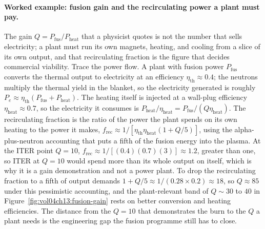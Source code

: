 \paragraph{Worked example: fusion gain and the recirculating power a plant must pay.}
The gain $Q = P_{\mathrm{fus}}/P_{\mathrm{heat}}$ that a physicist quotes is not
the number that sells electricity; a plant must run its own magnets, heating,
and cooling from a slice of its own output, and that recirculating fraction is
the figure that decides commercial viability. Trace the power flow. A plant with
fusion power $P_{\mathrm{fus}}$ converts the thermal output to electricity at an
efficiency $\eta_{\mathrm{th}} \approx 0.4$; the neutrons multiply the thermal
yield in the blanket, so the electricity generated is roughly $P_e \approx
\eta_{\mathrm{th}}(P_{\mathrm{fus}} + P_{\mathrm{heat}})$. The heating itself is
injected at a wall-plug efficiency $\eta_{\mathrm{heat}} \approx 0.7$, so the
electricity it consumes is $P_{\mathrm{heat}}/\eta_{\mathrm{heat}} =
P_{\mathrm{fus}}/(Q\eta_{\mathrm{heat}})$. The recirculating fraction is the
ratio of the power the plant spends on its own heating to the power it makes,
$f_{\mathrm{rec}} \approx 1/[\eta_{\mathrm{th}}\eta_{\mathrm{heat}}(1 + Q/5)]$,
using the alpha-plus-neutron accounting that puts a fifth of the fusion energy
into the plasma. At the ITER point $Q = 10$, $f_{\mathrm{rec}} \approx 1/[(0.4)
(0.7)(3)] \approx 1.2$, greater than one, so ITER at $Q = 10$ would spend more
than its whole output on itself, which is why it is a gain demonstration and not
a power plant. To drop the recirculating fraction to a fifth of output demands
$1 + Q/5 \approx 1/(0.28\times 0.2) \approx 18$, so $Q \approx 85$ under this
pessimistic accounting, and the plant-relevant band of $Q \sim 30$ to $40$ in
Figure~\ref{fig:vol04ch13:fusion-gain} rests on better conversion and heating
efficiencies. The distance from the $Q = 10$ that demonstrates the burn to the
$Q$ a plant needs is the engineering gap the fusion programme still has to close.




